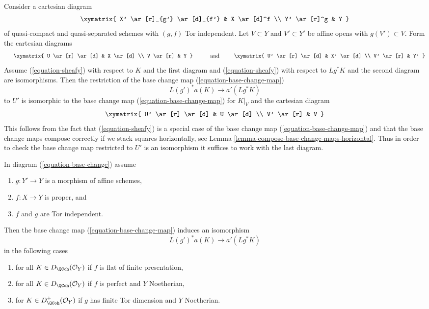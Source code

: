 \begin{remark}
\label{remark-check-over-affines}
Consider a cartesian diagram
$$
\xymatrix{
X' \ar[r]_{g'} \ar[d]_{f'} & X \ar[d]^f \\
Y' \ar[r]^g & Y
}
$$
of quasi-compact and quasi-separated schemes with $(g, f)$ Tor independent.
Let $V \subset Y$ and $V' \subset Y'$ be affine opens with
$g(V') \subset V$. Form the cartesian diagrams
$$
\vcenter{
\xymatrix{
U \ar[r] \ar[d] & X \ar[d] \\
V \ar[r] & Y
}
}
\quad\text{and}\quad
\vcenter{
\xymatrix{
U' \ar[r] \ar[d] & X' \ar[d] \\
V' \ar[r] & Y'
}
}
$$
Assume (\ref{equation-sheafy}) with respect to $K$
and the first diagram and (\ref{equation-sheafy})
with respect to $Lg^*K$ and the second diagram are isomorphisms.
Then the restriction of the base change map (\ref{equation-base-change-map})
$$
L(g')^*a(K) \longrightarrow a'(Lg^*K)
$$
to $U'$ is isomorphic to the base change map
(\ref{equation-base-change-map}) for $K|_V$ and the
cartesian diagram
$$
\xymatrix{
U' \ar[r] \ar[d] & U \ar[d] \\
V' \ar[r] & V
}
$$
This follows from the fact that (\ref{equation-sheafy})
is a special case of the base change map (\ref{equation-base-change-map})
and that the base change maps compose correctly if we stack squares
horizontally, see Lemma \ref{lemma-compose-base-change-maps-horizontal}.
Thus in order to check the base change map restricted to $U'$
is an isomorphism it suffices to work with the last diagram.
\end{remark}

\begin{lemma}
\label{lemma-more-base-change}
In diagram (\ref{equation-base-change}) assume
\begin{enumerate}
\item $g : Y' \to Y$ is a morphism of affine schemes,
\item $f : X \to Y$ is proper, and
\item $f$ and $g$ are Tor independent.
\end{enumerate}
Then the base change map (\ref{equation-base-change-map}) induces an
isomorphism
$$
L(g')^*a(K) \longrightarrow a'(Lg^*K)
$$
in the following cases
\begin{enumerate}
\item for all $K \in D_\QCoh(\mathcal{O}_Y)$ if $f$
is flat of finite presentation,
\item for all $K \in D_\QCoh(\mathcal{O}_Y)$ if $f$
is perfect and $Y$ Noetherian,
\item for $K \in D_\QCoh^+(\mathcal{O}_Y)$ if $g$ has finite Tor dimension
and $Y$ Noetherian.
\end{enumerate}
\end{lemma}


